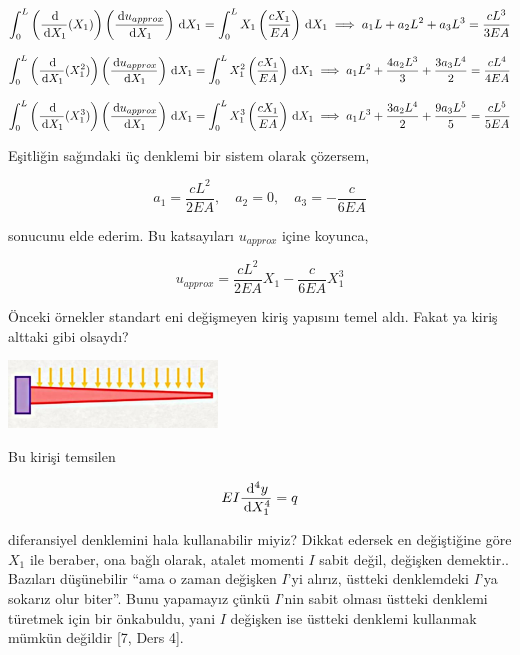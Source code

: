 \documentclass[12pt,fleqn]{article}\usepackage{../../common}
\begin{document}
$$
\int_{0}^{L} \left( \frac{\,\mathrm{d}}{\,\mathrm{d} X_1} (X_1) \right)
\left( \frac{\,\mathrm{d} u_{approx}}{\,\mathrm{d} X_1}\right) \,\mathrm{d} X_1 =
\int_{0}^{L} X_1  \left( \frac{c X_1}{EA} \right) \,\mathrm{d} X_1
\implies a_1 L + a_2 L^2 + a_3 L^3 = \frac{c L^3}{3EA}
$$

$$
\int_{0}^{L} \left( \frac{\,\mathrm{d}}{\,\mathrm{d} X_1} (X_1^2) \right)
\left( \frac{\,\mathrm{d} u_{approx}}{\,\mathrm{d} X_1}\right) \,\mathrm{d} X_1 =
\int_{0}^{L} X_1^2  \left( \frac{c X_1}{EA} \right) \,\mathrm{d} X_1
\implies a_1 L^2 + \frac{4 a_2 L^3}{3} + \frac{3 a_3 L^4}{2} = \frac{cL^4}{4EA}
$$

$$
\int_{0}^{L} \left( \frac{\,\mathrm{d}}{\,\mathrm{d} X_1} (X_1^3) \right)
\left( \frac{\,\mathrm{d} u_{approx}}{\,\mathrm{d} X_1}\right) \,\mathrm{d} X_1 =
\int_{0}^{L} X_1^3  \left( \frac{c X_1}{EA} \right) \,\mathrm{d} X_1
\implies a_1 L^3 + \frac{3 a_2 L^4}{2} + \frac{9 a_3 L^5}{5} = \frac{cL^5}{5EA}
$$

Eşitliğin sağındaki üç denklemi bir sistem olarak çözersem,

$$
a_1 = \frac{c L^2}{2EA}, \quad a_2 = 0, \quad a_3 = -\frac{c}{6EA}
$$

sonucunu elde ederim. Bu katsayıları $u_{approx}$ içine koyunca,

$$
u_{approx} = \frac{c L^2}{2EA} X_1 -\frac{c}{6EA} X_1^3
$$



























Önceki örnekler standart eni değişmeyen kiriş yapısını temel aldı.  Fakat ya
kiriş alttaki gibi olsaydı?

\includegraphics[width=15em]{compscieng_bpp45fem2_01.jpg}

Bu kirişi temsilen

$$
E I \frac{\,\mathrm{d}^4 y}{\,\mathrm{d} X_1^4} = q
$$

diferansiyel denklemini hala kullanabilir miyiz? Dikkat edersek en değiştiğine
göre $X_1$ ile beraber, ona bağlı olarak, atalet momenti $I$ sabit değil,
değişken demektir.. Bazıları düşünebilir ``ama o zaman değişken $I$'yi alırız,
üstteki denklemdeki $I$'ya sokarız olur biter''. Bunu yapamayız çünkü $I$'nin
sabit olması üstteki denklemi türetmek için bir önkabuldu, yani $I$ değişken ise
üstteki denklemi kullanmak mümkün değildir [7, Ders 4].
\end{document}
